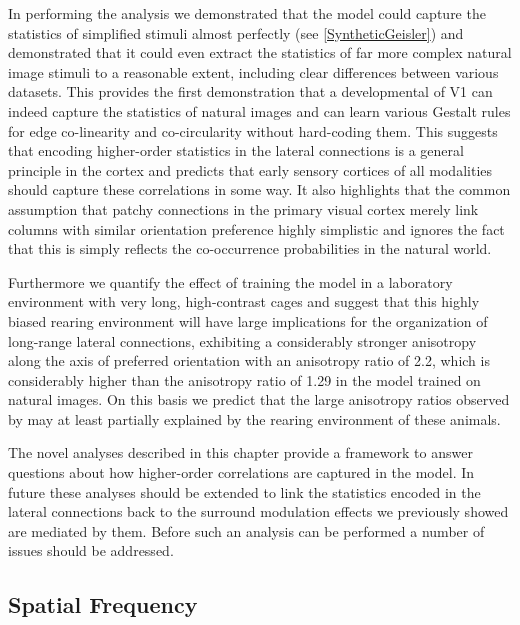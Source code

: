 In performing the analysis we demonstrated that the model could
capture the statistics of simplified stimuli almost perfectly (see
\ref{SyntheticGeisler}) and demonstrated that it could even extract
the statistics of far more complex natural image stimuli to a
reasonable extent, including clear differences between various
datasets. This provides the first demonstration that a developmental
of V1 can indeed capture the statistics of natural images and can
learn various Gestalt rules for edge co-linearity and co-circularity
without hard-coding them. This suggests that encoding higher-order
statistics in the lateral connections is a general principle in the
cortex and predicts that early sensory cortices of all modalities
should capture these correlations in some way. It also highlights that
the common assumption that patchy connections in the primary visual
cortex merely link columns with similar orientation preference highly
simplistic and ignores the fact that this is simply reflects the
co-occurrence probabilities in the natural world.

Furthermore we quantify the effect of training the model in a
laboratory environment with very long, high-contrast cages and suggest
that this highly biased rearing environment will have large
implications for the organization of long-range lateral connections,
exhibiting a considerably stronger anisotropy along the axis of
preferred orientation with an anisotropy ratio of 2.2, which is
considerably higher than the anisotropy ratio of 1.29 in the model
trained on natural images. On this basis we predict that the large
anisotropy ratios observed by \citep{Bosking1997} may at least
partially explained by the rearing environment of these animals.

The novel analyses described in this chapter provide a framework to
answer questions about how higher-order correlations are captured in
the model. In future these analyses should be extended to link the
statistics encoded in the lateral connections back to the surround
modulation effects we previously showed are mediated by them. Before
such an analysis can be performed a number of issues should be
addressed.

\subsection{Spatial Frequency}

